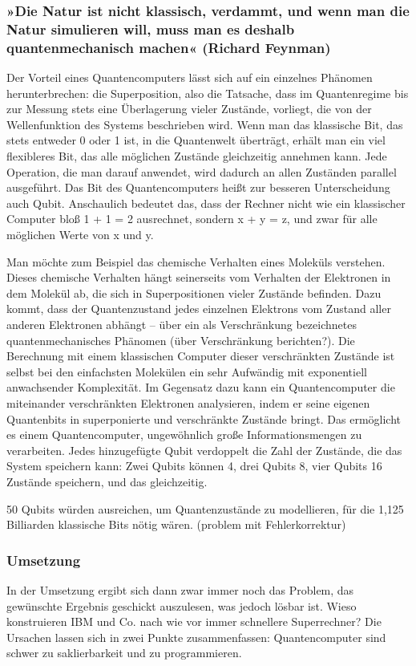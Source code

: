 \documentclass[a4paper,10pt]{scrartcl}
\begin{document}
\subsubsection{»Die Natur ist nicht klassisch, verdammt, und wenn man die Natur simulieren will, muss man es deshalb quantenmechanisch machen« (Richard Feynman)}
Der Vorteil eines Quantencomputers lässt sich auf ein einzelnes Phänomen herunterbrechen: die Superposition, also die Tatsache, dass im Quantenregime bis zur Messung stets eine Überlagerung vieler Zustände, vorliegt, die von der Wellenfunktion des Systems beschrieben wird. Wenn man das klassische Bit, das stets entweder 0 oder 1 ist, in die Quantenwelt überträgt, erhält man ein viel flexibleres Bit, das alle möglichen Zustände gleichzeitig annehmen kann. Jede Operation, die man darauf anwendet, wird dadurch an allen Zuständen parallel ausgeführt. Das Bit des Quantencomputers heißt zur besseren Unterscheidung auch Qubit. Anschaulich bedeutet das, dass der Rechner nicht wie ein klassischer Computer bloß 1 + 1 = 2 ausrechnet, sondern x + y = z, und zwar für alle möglichen Werte von x und y.

Man möchte zum Beispiel das chemische Verhalten eines Moleküls verstehen. Dieses chemische Verhalten hängt seinerseits vom Verhalten der Elektronen in dem Molekül ab, die sich in Superpositionen vieler Zustände befinden. Dazu kommt, dass der Quantenzustand jedes einzelnen Elektrons vom Zustand aller anderen Elektronen abhängt – über ein als Verschränkung bezeichnetes quantenmechanisches Phänomen (über Verschränkung berichten?). Die Berechnung mit einem klassischen Computer dieser verschränkten Zustände ist selbst bei den einfachsten Molekülen ein sehr Aufwändig mit exponentiell anwachsender Komplexität.
Im Gegensatz dazu kann ein Quantencomputer die miteinander verschränkten Elektronen analysieren, indem er seine eigenen Quantenbits in superponierte und verschränkte Zustände bringt. Das ermöglicht es einem Quantencomputer, ungewöhnlich große Informationsmengen zu verarbeiten. Jedes hinzugefügte Qubit verdoppelt die Zahl der Zustände, die das System speichern kann: Zwei Qubits können 4, drei Qubits 8, vier Qubits 16 Zustände speichern, und das gleichzeitig.

50 Qubits würden ausreichen, um Quantenzustände zu modellieren, für die 1,125 Billiarden klassische Bits nötig wären. (problem mit Fehlerkorrektur)

\subsubsection{Umsetzung}
In der Umsetzung ergibt sich dann zwar immer noch das Problem, das gewünschte Ergebnis geschickt auszulesen, was jedoch lösbar ist.
Wieso konstruieren IBM und Co. nach wie vor immer schnellere Superrechner? Die Ursachen lassen sich in zwei Punkte zusammenfassen: Quantencomputer sind schwer zu saklierbarkeit und zu programmieren.
\end{document}
